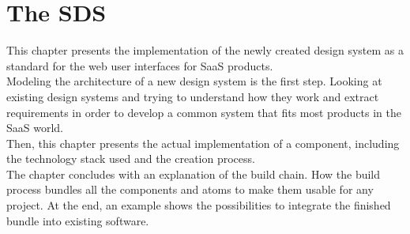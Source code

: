 \newpage
\section{The \acl{SDS}}
This chapter presents the implementation of the newly created design system as a standard for the web user interfaces for SaaS products. \\
Modeling the architecture of a new design system is the first step. Looking at existing design systems and trying to understand how they work and extract requirements in order to develop a common system that fits most products in the SaaS world. \\
Then, this chapter presents the actual implementation of a component, including the technology stack used and the creation process. \\
The chapter concludes with an explanation of the build chain. How the build process bundles all the components and atoms to make them usable for any project. At the end, an example shows the possibilities to integrate the finished bundle into existing software.


